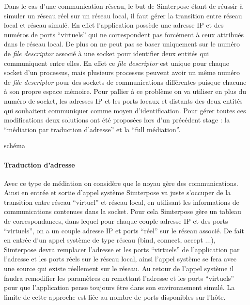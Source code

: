 Dans le cas d'une communication réseau, le but de Simterpose étant de réussir à
simuler un réseau réel sur un réseau local, il faut gérer la transition entre
réseau local et réseau simulé. En effet l'application possède une adresse IP et
des numéros de ports ``virtuels'' qui ne correspondent pas forcément à ceux
attribués dans le réseau local. De plus on ne peut pas se baser uniquement sur
le numéro de \textit{file descriptor} associé à une socket pour identifier deux
entités qui communiquent entre elles. En effet ce \textit{file descriptor} est
unique pour chaque socket d'un processus, mais plusieurs processus peuvent avoir
un même numéro de \textit{file descriptor} pour des sockets de communications
différentes puisque chacune à son propre espace mémoire. Pour pallier à ce
problème on va utiliser en plus du numéro de socket, les adresses IP et les
ports locaux et distants des deux entités qui souhaitent communiquer comme moyen
d'identification. Pour gérer toutes ces modifications deux solutions ont été
proposées lors d'un précédent stage
\cite{interception:GUILLAUME:interception_syscall}: la ``médiation par
traduction d'adresse'' et la ``full médiation''.

{\color{red}schéma}
\paragraph{Traduction d'adresse}
 Avec ce type de médiation on considère que le noyau gère des
 communications. Ainsi en entrée et sortie d'appel système Simterpose va juste
 s'occuper de la transition entre réseau ``virtuel'' et réseau local, en
 utilisant les informations de communications contenues dans la socket. Pour
 cela Simterpose gère un tableau de correspondances, dans lequel pour chaque
 couple adresse IP et des ports ``virtuels'', on a un couple adresse IP et ports
 ``réel'' sur le réseau associé.  De fait en entrée d'un appel système de type
 réseau (bind, connect, accept ...), Simterpose devra remplacer l'adresse et les
 ports ``virtuels'' de l'application par l'adresse et les ports réels sur le
 réseau local, ainsi l'appel système se fera avec une source qui existe
 réellement sur le réseau. Au retour de l'appel système il faudra remodifier les
 paramètres en remettant l'adresse et les ports ``virtuels'' pour que
 l'application pense toujours être dans son environnement simulé.  La limite de
 cette approche est liée au nombre de ports disponibles sur l'hôte.

